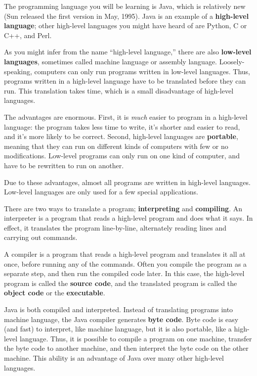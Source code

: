 \documentclass[12pt]{book}
\theoremstyle{definition}
\begin{document}
The programming language you will be learning is Java, which is
relatively new (Sun released the first version in May, 1995).  Java is
an example of a {\bf high-level language}; other high-level languages
you might have heard of are Python, C or C++, and Perl.

As you might infer from the name ``high-level language,'' there are
also {\bf low-level languages}, sometimes called machine
language or assembly language.  Loosely-speaking, computers can only
run programs written in low-level languages.  Thus, programs
written in a high-level language have to be translated before they can
run.  This translation takes time, which is a small disadvantage
of high-level languages.


The advantages are enormous.  First,
it is {\em much} easier to program in a high-level language:
the program takes less time to write,
it's shorter and easier to read, and it's more likely to be
correct.  Second, high-level languages are {\bf portable},
meaning that they can run on different kinds of computers with
few or no modifications.  Low-level programs can only run
on one kind of computer, and have to be rewritten to run on
another.

Due to these advantages, almost all programs are written in
high-level languages.  Low-level languages are only used for
a few special applications.


There are two ways to translate a program;
{\bf interpreting} and {\bf compiling}.  An interpreter
is a program that reads a high-level program
and does what it says.  In effect, it translates
the program line-by-line, alternately reading lines and
carrying out commands.

A compiler is a program that reads a high-level program and
translates it all at once, before running any of the commands.
Often you compile the program as a separate step, and then
run the compiled code later.  In this case, the high-level
program is called the {\bf source code}, and the translated
program is called the {\bf object code} or the {\bf executable}.

Java is both compiled and
interpreted.  Instead of translating programs into
machine language, the Java compiler generates {\bf byte code}.
Byte code is easy (and fast) to interpret, like machine language,
but it is also portable, like a high-level language.  Thus,
it is possible to compile a program on one machine,
transfer the byte code to another machine,
and then interpret the byte code on the other machine.  This
ability is an advantage of Java over many other
high-level languages.
\end{document}
